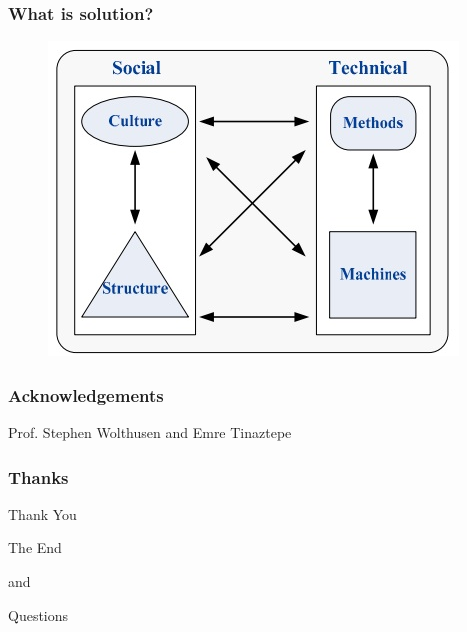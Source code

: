 \documentclass{beamer}
\begin{document}
\begin{frame}
	\frametitle{What is solution?}
	\begin{figure}
		\includegraphics[width=0.8\linewidth]{img/sociatech.jpg}
	\end{figure}
\end{frame}

\begin{frame}
	\frametitle{Acknowledgements}
	\Large{\centerline{Prof. Stephen Wolthusen and Emre Tinaztepe}}
\end{frame}

\begin{frame}
	\frametitle{Thanks}
	\Huge{\centerline{Thank You}}
\end{frame}




\begin{frame}
	\Huge{\centerline{The End}}
	\centerline{and}
	\Huge{\centerline{Questions}}
\end{frame}

\end{document}
